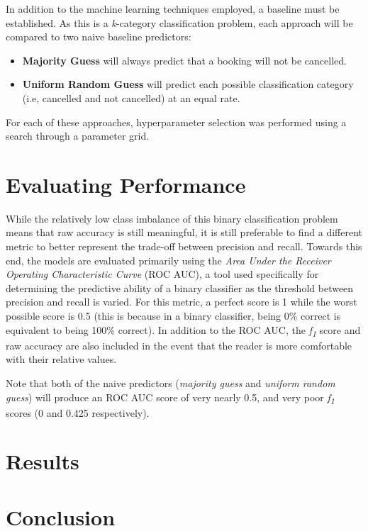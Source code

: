 \documentclass[10pt,conference]{IEEEtran}
\begin{document}
  In addition to the machine learning techniques employed, a baseline must be established. As this is a \emph{k}-category classification problem, each approach will be compared to two naive baseline predictors:
  \begin{itemize}
    \item \textbf{Majority Guess} will always predict that a booking will not be cancelled.
    \item \textbf{Uniform Random Guess} will predict each possible classification category (i.e, cancelled and not cancelled) at an equal rate.
  \end{itemize}
  For each of these approaches, hyperparameter selection was performed using a search through a parameter grid.

\section{Evaluating Performance}
 While the relatively low class imbalance of this binary classification problem means that raw accuracy is still meaningful, it is still preferable to find a different metric to better represent the trade-off between precision and recall. Towards this end, the models are evaluated primarily using the \emph{Area Under the Receiver Operating Characteristic Curve} (ROC AUC), a tool used specifically for determining the predictive ability of a binary classifier as the threshold between precision and recall is varied\cite{Fawcett2006}. For this metric, a perfect score is 1 while the worst possible score is 0.5 (this is because in a binary classifier, being 0\% correct is equivalent to being 100\% correct). In addition to the ROC AUC, the \emph{f\textsubscript{1}} score\cite{rijsbergen_1995} and raw accuracy are also included in the event that the reader is more comfortable with their relative values.
 
 Note that both of the naive predictors (\emph{majority guess} and \emph{uniform random guess}) will produce an ROC AUC score of very nearly 0.5, and very poor \emph{f\textsubscript{1}} scores (0 and 0.425 respectively).
\section{Results}


\section{Conclusion}

\nocite{*}




\vspace{12pt}
\end{document}
